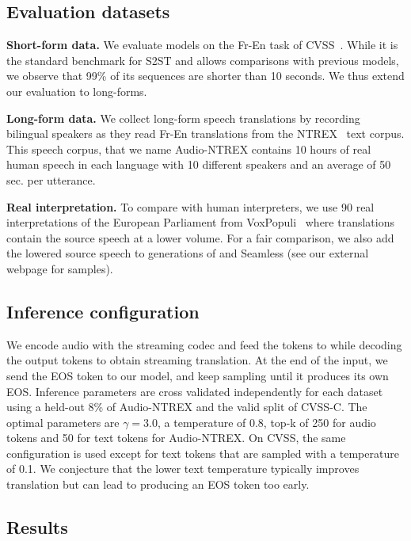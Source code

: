 \subsection{Evaluation datasets}

\textbf{Short-form data.}
We evaluate models on the Fr-En task of CVSS~\cite{cvss}. While it is the standard benchmark for S2ST and allows comparisons with previous models, we observe that 99\% of its sequences are shorter than 10 seconds. We thus extend our evaluation to long-forms.

\textbf{Long-form data.}
We collect long-form speech translations by recording bilingual speakers as they read Fr-En translations from the NTREX~\cite{ntrex} text corpus. This speech corpus, that we name Audio-NTREX contains 10 hours of real human speech in each language with 10 different speakers and an average of 50 sec. per utterance.

\textbf{Real interpretation.}
To compare with human interpreters, we use 90 real interpretations of the European Parliament from VoxPopuli~\cite{voxpopuli} where translations contain the source speech at a lower volume. For a fair comparison, we also add the lowered source speech to generations of \ours and Seamless (see our external webpage for samples).

\subsection{Inference configuration}

We encode audio with the streaming codec and feed the tokens to \ours while decoding the output tokens to obtain streaming translation. 
At the end of the input, we send the EOS token to our model, and keep sampling until it produces its own EOS. Inference parameters are cross validated independently for each dataset using a held-out 8\% of Audio-NTREX and the valid split of CVSS-C. 
The optimal parameters are $\gamma = 3.0$, a temperature of 0.8, top-k of 250 for audio tokens and 50 for text tokens for Audio-NTREX. On CVSS, the same configuration is used except for text tokens that are sampled with a temperature of 0.1. We conjecture that the lower text temperature typically improves translation but can lead to producing an EOS token too early.


\subsection{Results}
\label{sec:results}

